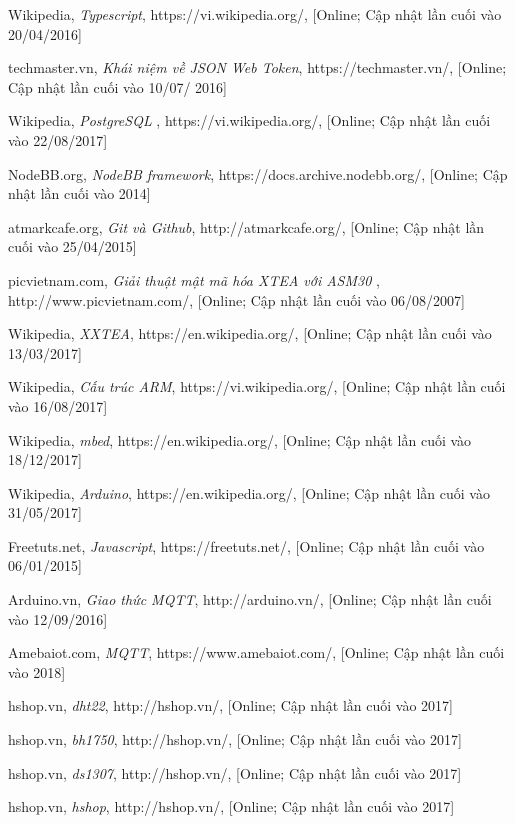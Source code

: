 \documentclass[a4paper,12pt,oneside]{article}
\begin{document}
\begin{thebibliography}{80}
 Wikipedia, 
\textit{Typescript}, https://vi.wikipedia.org/, [Online; Cập nhật lần cuối vào 20/04/2016]

 techmaster.vn,
\textit{Khái niệm về JSON Web Token}, https://techmaster.vn/, [Online; Cập nhật lần cuối vào 10/07/ 2016]

 Wikipedia, 
\textit{PostgreSQL} , https://vi.wikipedia.org/, [Online; Cập nhật lần cuối vào 22/08/2017]

 NodeBB.org, 
\textit{NodeBB framework}, https://docs.archive.nodebb.org/, [Online; Cập nhật lần cuối vào 2014]

 atmarkcafe.org, 
\textit{Git và Github}, http://atmarkcafe.org/, [Online; Cập nhật lần cuối vào 25/04/2015]

 picvietnam.com,
\textit{Giải thuật mật mã hóa XTEA với ASM30} , http://www.picvietnam.com/, [Online; Cập nhật lần cuối vào 06/08/2007]

 Wikipedia, 
\textit{XXTEA}, https://en.wikipedia.org/, [Online; Cập nhật lần cuối vào 13/03/2017]

 Wikipedia, 
\textit{Cấu trúc ARM}, https://vi.wikipedia.org/, [Online; Cập nhật lần cuối vào 16/08/2017] %

 Wikipedia, 
\textit{mbed}, https://en.wikipedia.org/, [Online; Cập nhật lần cuối vào 18/12/2017] %

 Wikipedia, 
\textit{Arduino}, https://en.wikipedia.org/, [Online; Cập nhật lần cuối vào 31/05/2017] %

 Freetuts.net,
\textit{Javascript}, https://freetuts.net/, [Online; Cập nhật lần cuối vào 06/01/2015]

 Arduino.vn, 
\textit{Giao thức MQTT}, http://arduino.vn/, [Online; Cập nhật lần cuối vào 12/09/2016]

 Amebaiot.com,
\textit{MQTT}, https://www.amebaiot.com/, [Online; Cập nhật lần cuối vào 2018]

 hshop.vn, 
\textit{dht22}, http://hshop.vn/, [Online; Cập nhật lần cuối vào 2017]%

 hshop.vn, 
\textit{bh1750}, http://hshop.vn/, [Online; Cập nhật lần cuối vào 2017] %

 hshop.vn, 
\textit{ds1307}, http://hshop.vn/, [Online; Cập nhật lần cuối vào 2017] %

 hshop.vn,
\textit{hshop}, http://hshop.vn/, [Online; Cập nhật lần cuối vào 2017]


\end{thebibliography}
\end{document}
